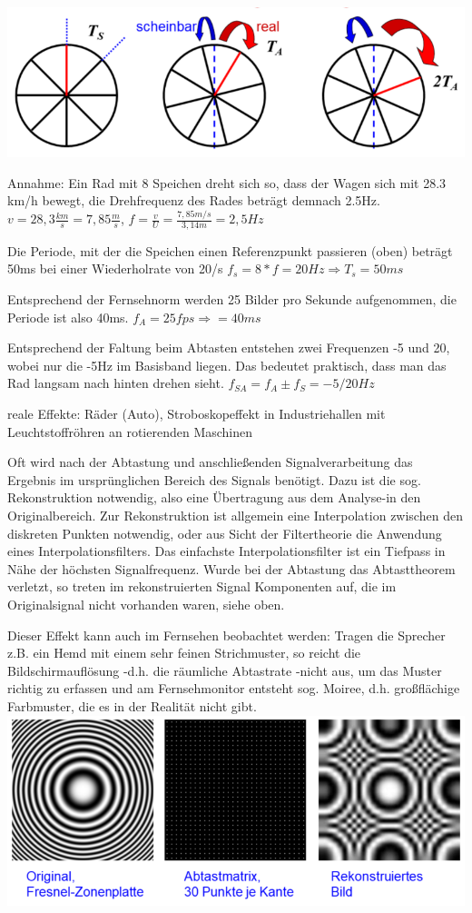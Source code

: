 \documentclass[a4paper]{article}
\begin{document}
\begin{multicols}{3}
  \begin{itemize*}
    \item \includegraphics[width=.5\linewidth]{Assets/Biosignalverarbeitung-beispiel-film.png}
    \item Annahme: Ein Rad mit 8 Speichen dreht sich so, dass der Wagen sich mit 28.3 km/h bewegt, die Drehfrequenz des Rades beträgt demnach 2.5Hz. $v=28,3\frac{km}{s}=7,85\frac{m}{s}$, $f=\frac{v}{U}=\frac{7,85m/s}{3,14m}=2,5Hz$
    \item Die Periode, mit der die Speichen einen Referenzpunkt passieren (oben) beträgt 50ms bei einer Wiederholrate von 20/s $f_s=8*f=20Hz\Rightarrow T_s=50ms$
    \item Entsprechend der Fernsehnorm werden 25 Bilder pro Sekunde aufgenommen, die Periode ist also 40ms. $f_A=25fps\Rightarrow=40ms$
    \item Entsprechend der Faltung beim Abtasten entstehen zwei Frequenzen -5 und 20, wobei nur die -5Hz im Basisband liegen. Das bedeutet praktisch, dass man das Rad langsam nach hinten drehen sieht. $f_{SA}=f_A\pm f_S=-5/20 Hz$
    \item reale Effekte: Räder (Auto), Stroboskopeffekt in Industriehallen mit Leuchtstoffröhren an rotierenden Maschinen
  \end{itemize*}

  Oft wird nach der Abtastung und anschließenden Signalverarbeitung das
  Ergebnis im ursprünglichen Bereich des Signals benötigt. Dazu ist die
  sog. Rekonstruktion notwendig, also eine Übertragung aus dem Analyse-in
  den Originalbereich. Zur Rekonstruktion ist allgemein eine Interpolation
  zwischen den diskreten Punkten notwendig, oder aus Sicht der
  Filtertheorie die Anwendung eines Interpolationsfilters. Das einfachste
  Interpolationsfilter ist ein Tiefpass in Nähe der höchsten
  Signalfrequenz. Wurde bei der Abtastung das Abtasttheorem verletzt, so
  treten im rekonstruierten Signal Komponenten auf, die im Originalsignal
  nicht vorhanden waren, siehe oben.

  Dieser Effekt kann auch im Fernsehen beobachtet werden: Tragen die
  Sprecher z.B. ein Hemd mit einem sehr feinen Strichmuster, so reicht die
  Bildschirmauflösung -d.h. die räumliche Abtastrate -nicht aus, um das
  Muster richtig zu erfassen und am Fernsehmonitor entsteht sog. Moiree,
  d.h. großflächige Farbmuster, die es in der Realität nicht gibt.
  \includegraphics[width=.5\linewidth]{Assets/Biosignalverarbeitung-abtastung-rekonstruktion.png}


\end{multicols}
\end{document}
